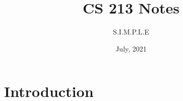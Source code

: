 \documentclass[12pt, oneside]{report}
\title{CS 213 Notes}
\author{S.I.M.P.L.E}
\date{July, 2021}
\begin{document}
	\maketitle
	\tableofcontents
	\chapter{Introduction}
	
\end{document}
